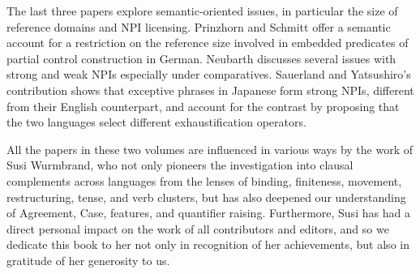 \documentclass[output=paper]{langscibook}
\begin{document}
The last three papers explore semantic-oriented issues, in particular the size of reference domains and NPI licensing.  
Prinzhorn and Schmitt offer a semantic account for a restriction on the reference size involved in embedded predicates of partial control construction in German.
Neubarth discusses several issues with strong and weak NPIs especially under comparatives. 
Sauerland and Yatsushiro's contribution shows that exceptive phrases in Japanese form strong NPIs, different from their English counterpart, and account for the contrast by proposing that the two languages select different exhaustification operators. 

All the papers in these two volumes are influenced in various ways by the work of Susi Wurmbrand, who not only pioneers the investigation into clausal complements across languages from the lenses of binding, finiteness, movement, restructuring, tense, and verb clusters, but has also deepened our understanding of Agreement, Case, features, and quantifier raising. Furthermore, Susi has had a direct personal impact on the work of all contributors and editors, and so we dedicate this book to her not only in recognition of her achievements, but also in gratitude of her generosity to us.


{\sloppy\printbibliography[heading=subbibliography,notkeyword=this]}
\end{document}
